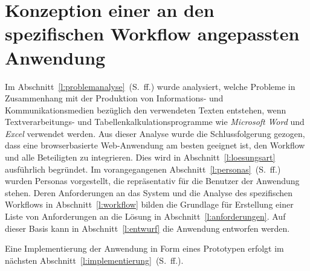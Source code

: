 \section{Konzeption einer an den spezifischen Workflow angepassten Anwendung}\label{l:konzeption}

Im Abschnitt~\ref{l:problemanalyse}~(S.\pageref{l:problemanalyse}~ff.) wurde analysiert, welche Probleme in Zusammenhang mit der Produktion von Informations- und Kommunikationsmedien bezüglich den verwendeten Texten entstehen, wenn Textverarbeitungs- und Tabellenkalkulationsprogramme wie \emph{Microsoft} \emph{Word} und \emph{Excel} verwendet werden. Aus dieser Analyse wurde die Schlussfolgerung gezogen, dass eine browserbasierte Web-Anwendung am besten geeignet ist, den Workflow und alle Beteiligten zu integrieren. Dies wird in Abschnitt~\ref{l:loesungsart} ausführlich begründet. Im vorangegangenen Abschnitt~\ref{l:personas}~(S.\pageref{l:personas}~ff.) wurden Personas vorgestellt, die repräsentativ für die Benutzer der Anwendung stehen. Deren Anforderungen an das System und die Analyse des spezifischen Workflows in Abschnitt~\ref{l:workflow} bilden die Grundlage für Erstellung einer Liste von Anforderungen an die Lösung in Abschnitt~\ref{l:anforderungen}. Auf dieser Basis kann in Abschnitt~\ref{l:entwurf} die Anwendung entworfen werden.

Eine Implementierung der Anwendung in Form eines Prototypen erfolgt im nächsten Abschnitt~\ref{l:implementierung}~(S.\pageref{l:implementierung}~ff.).











